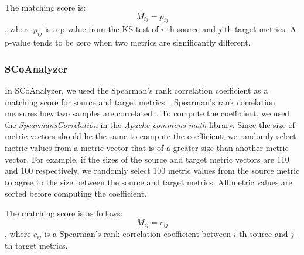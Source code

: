The matching score is:
\begin{equation}M_{ij}=p_{ij}\end{equation}
, where $p_{ij}$ is a p-value from the KS-test of $i$-th source and $j$-th
target metrics. A p-value tends to be zero when two metrics are significantly
different.

\subsubsection{SCoAnalyzer}
In SCoAnalyzer, we used the Spearman's
rank correlation coefficient as a matching score for source and target
metrics~\cite{Spearman10}.
Spearman's rank correlation measures how two samples
are correlated~\cite{Spearman10}. To compute the coefficient, we used the
{\em SpearmansCorrelation} in the {\em Apache commons math} library. Since the
size of metric vectors should be the same to compute the coefficient, we
randomly select metric values from a metric vector that is of a greater size
than another metric vector. For example, if the sizes of the source and target metric
vectors are 110 and 100 respectively, we randomly select 100 metric values from the
source metric to agree to the size between the source and target metrics. All
metric values are sorted before computing the coefficient.

The matching score is as follows:
\begin{equation}M_{ij}=c_{ij}\end{equation}
, where $c_{ij}$ is a Spearman's rank correlation coefficient between $i$-th
source and $j$-th target metrics.

